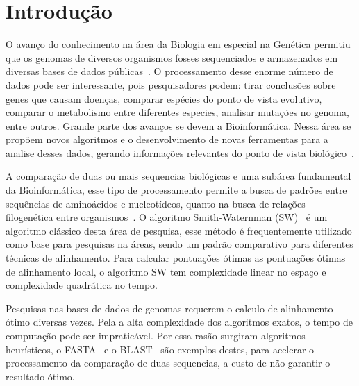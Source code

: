 \documentclass[12pt, a4paper]{article}
\numberwithin{table}{section}
\begin{document}
\section{Introdução}
\label{sec:introducao}



O avanço do conhecimento na área da Biologia em especial na Genética permitiu que
os genomas de diversos organismos fosses sequenciados e armazenados em diversas 
bases de dados públicas~\cite{6545119}. O processamento desse enorme número de 
dados pode ser interessante, pois pesquisadores podem: tirar conclusões sobre 
genes que causam doenças, comparar espécies do ponto de vista evolutivo, comparar 
o metabolismo entre diferentes especies, analisar mutações no genoma, entre 
outros. Grande parte dos avanços se devem a Bioinformática. Nessa área se 
propõem novos algoritmos e o desenvolvimento de novas ferramentas para a analise
desses dados, gerando informações relevantes do ponto de vista 
biológico~\cite{Luscombe2001WhatIB}.

A comparação de duas ou mais sequencias biológicas e uma subárea fundamental
da Bioinformática, esse tipo de processamento permite a busca de padrões 
entre sequências de aminoácidos e nucleotídeos, quanto na busca de relações
filogenética entre organismos~\cite{Gollery2005BioinformaticsSA}. O algoritmo
Smith-Waternman (SW)~\cite{SMITH1981195} é um algoritmo clássico desta área 
de pesquisa, esse método é frequentemente utilizado como base para 
pesquisas na áreas, sendo um padrão comparativo para diferentes técnicas de 
alinhamento. Para  calcular pontuações ótimas as pontuações ótimas 
de alinhamento local, o algoritmo SW tem complexidade linear no espaço e 
complexidade quadrática no tempo.

Pesquisas nas bases de dados de genomas requerem o calculo de alinhamento ótimo 
diversas vezes. Pela a alta complexidade dos algoritmos exatos, o tempo de 
computação pode ser impraticável. Por essa rasão surgiram algoritmos heurísticos, 
o FASTA~\cite{PMID:3162770} e o BLAST~\cite{ALTSCHUL1990403} são exemplos destes, 
para acelerar o processamento da comparação de duas sequencias, a custo de não 
garantir o resultado ótimo. 
\end{document}
